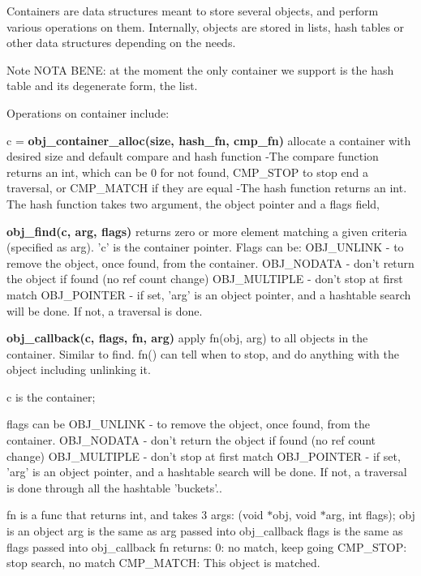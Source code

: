 Containers are data structures meant to store several objects, and perform various operations on them. Internally, objects are stored in lists, hash tables or other data structures depending on the needs.

\begin{DoxyNote}{Note}
NOTA BENE: at the moment the only container we support is the hash table and its degenerate form, the list.
\end{DoxyNote}
Operations on container include:


\begin{DoxyItemize}
\item c = {\bfseries obj\_\-container\_\-alloc(size, hash\_\-fn, cmp\_\-fn)} allocate a container with desired size and default compare and hash function -\/The compare function returns an int, which can be 0 for not found, CMP\_\-STOP to stop end a traversal, or CMP\_\-MATCH if they are equal -\/The hash function returns an int. The hash function takes two argument, the object pointer and a flags field,
\end{DoxyItemize}


\begin{DoxyItemize}
\item {\bfseries obj\_\-find(c, arg, flags)} returns zero or more element matching a given criteria (specified as arg). 'c' is the container pointer. Flags can be: OBJ\_\-UNLINK -\/ to remove the object, once found, from the container. OBJ\_\-NODATA -\/ don't return the object if found (no ref count change) OBJ\_\-MULTIPLE -\/ don't stop at first match OBJ\_\-POINTER -\/ if set, 'arg' is an object pointer, and a hashtable search will be done. If not, a traversal is done.
\end{DoxyItemize}


\begin{DoxyItemize}
\item {\bfseries obj\_\-callback(c, flags, fn, arg)} apply fn(obj, arg) to all objects in the container. Similar to find. fn() can tell when to stop, and do anything with the object including unlinking it.
\begin{DoxyItemize}
\item c is the container;
\end{DoxyItemize}
\end{DoxyItemize}

flags can be OBJ\_\-UNLINK -\/ to remove the object, once found, from the container. OBJ\_\-NODATA -\/ don't return the object if found (no ref count change) OBJ\_\-MULTIPLE -\/ don't stop at first match OBJ\_\-POINTER -\/ if set, 'arg' is an object pointer, and a hashtable search will be done. If not, a traversal is done through all the hashtable 'buckets'..
\begin{DoxyItemize}
\item fn is a func that returns int, and takes 3 args: (void $\ast$obj, void $\ast$arg, int flags); obj is an object arg is the same as arg passed into obj\_\-callback flags is the same as flags passed into obj\_\-callback fn returns: 0: no match, keep going CMP\_\-STOP: stop search, no match CMP\_\-MATCH: This object is matched.
\end{DoxyItemize}

